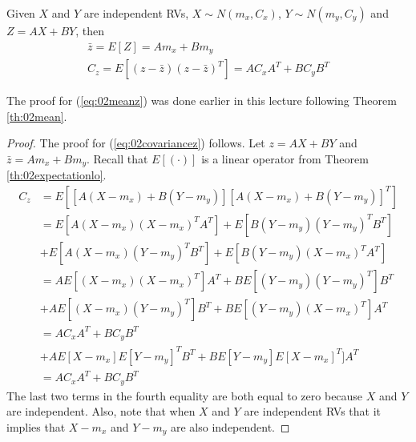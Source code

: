 \documentclass[lecture,12pt,]{pcms-l}
\begin{document}
\begin{theorem}
\label{th:02covariance}
Given $X$ and $Y$ are independent RVs, $X\sim N(m_x,C_x)$, $Y\sim N(m_y,C_y)$ and $Z=AX+BY$, then
\begin{align}
\label{eq:02meanz}
\bar{z} = E[Z] = Am_x+Bm_y \\
\label{eq:02covariancez}
C_z = E[(z-\bar{z})(z-\bar{z})^T] = AC_xA^T + BC_yB^T
\end{align}
\end{theorem}
The proof for (\ref{eq:02meanz}) was done earlier in this lecture following Theorem \ref{th:02mean}.
\begin{proof}
The proof for (\ref{eq:02covariancez}) follows. Let $z=AX+BY$ and $\bar{z}=Am_x+Bm_y$. Recall that $E[(\cdot)]$ is a linear operator from Theorem \ref{th:02expectationlo}.
\begin{align*}
C_z &= E\left[[A(X-m_x)+B(Y-m_y)][A(X-m_x)+B(Y-m_y)]^T\right] \\
&= E[A(X-m_x)(X-m_x)^TA^T] + E[B(Y-m_y)(Y-m_y)^TB^T] \\
&+ E[A(X-m_x)(Y-m_y)^TB^T] + E[B(Y-m_y)(X-m_x)^TA^T] \\
&= AE[(X-m_x)(X-m_x)^T]A^T + BE[(Y-m_y)(Y-m_y)^T]B^T \\
&+ AE[(X-m_x)(Y-m_y)^T]B^T + BE[(Y-m_y)(X-m_x)^T]A^T \\
&= AC_xA^T + BC_yB^T \\
&+ AE[X-m_x]E[Y-m_y]^TB^T + BE[Y-m_y]E[X-m_x]^T]A^T \\
&= AC_xA^T + BC_yB^T
\end{align*}
The last two terms in the fourth equality are both equal to zero because $X$ and $Y$ are independent. Also, note that when $X$ and $Y$ are independent RVs that it implies that $X-m_x$ and $Y-m_y$ are also independent.
\end{proof}
\end{document}

